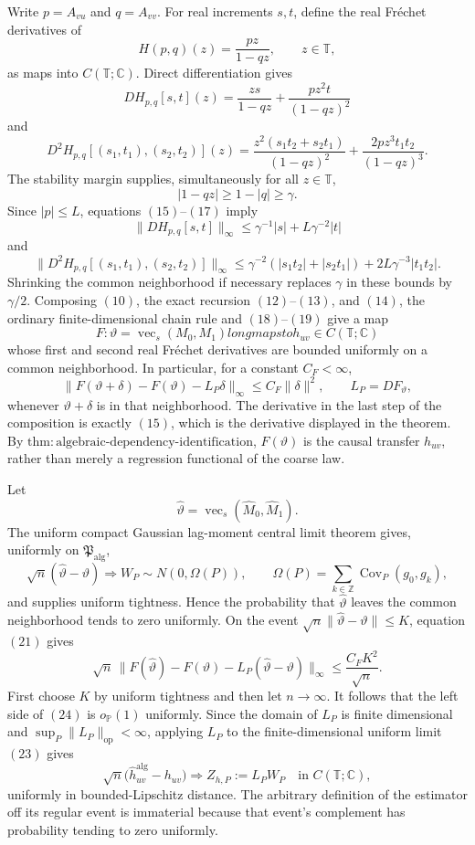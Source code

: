 Write \(p=A_{vu}\) and \(q=A_{vv}\).  For real increments \(s,t\), define the real Fr\'echet derivatives of
\[
 H(p,q)(z)=\frac{pz}{1-qz},\qquad z\in\mathbb T,
\tag{14}
\]
as maps into \(C(\mathbb T;\mathbb C)\).  Direct differentiation gives
\[
 DH_{p,q}[s,t](z)
 =\frac{zs}{1-qz}+\frac{pz^2t}{(1-qz)^2}
\tag{15}
\]
and
\[
 D^2H_{p,q}[(s_1,t_1),(s_2,t_2)](z)
 =\frac{z^2(s_1t_2+s_2t_1)}{(1-qz)^2}
  +\frac{2pz^3t_1t_2}{(1-qz)^3}.
\tag{16}
\]
The stability margin supplies, simultaneously for all \(z\in\mathbb T\),
\[
 |1-qz|\ge1-|q|\ge\gamma.
\tag{17}
\]
Since \(|p|\le L\), equations \((15)\)--\((17)\) imply
\[
 \|DH_{p,q}[s,t]\|_\infty
 \le\gamma^{-1}|s|+L\gamma^{-2}|t|
\tag{18}
\]
and
\[
 \|D^2H_{p,q}[(s_1,t_1),(s_2,t_2)]\|_\infty
 \le\gamma^{-2}(|s_1t_2|+|s_2t_1|)
   +2L\gamma^{-3}|t_1t_2|.
\tag{19}
\]
Shrinking the common neighborhood if necessary replaces \(\gamma\) in these bounds by \(\gamma/2\).  Composing \((10)\), the exact recursion \((12)\)--\((13)\), and \((14)\), the ordinary finite-dimensional chain rule and \((18)\)--\((19)\) give a map
\[
 F:\vartheta=\operatorname{vec}_{s}(M_0,M_1)longmapsto h_{uv}
 \in C(\mathbb T;\mathbb C)
\tag{20}
\]
whose first and second real Fr\'echet derivatives are bounded uniformly on a common neighborhood.  In particular, for a constant \(C_F<\infty\),
\[
 \|F(\vartheta+\delta)-F(\vartheta)-L_P\delta\|_\infty
 \le C_F\|\delta\|^2,
 \qquad L_P=DF_\vartheta,
\tag{21}
\]
whenever \(\vartheta+\delta\) is in that neighborhood.  The derivative in the last step of the composition is exactly \((15)\), which is the derivative displayed in the theorem.  By \(\mathrm{thm{:}algebraic\mbox{-}dependency\mbox{-}identification}\), \(F(\vartheta)\) is the causal transfer \(h_{uv}\), rather than merely a regression functional of the coarse law.

Let
\[
 \widehat\vartheta
 =\operatorname{vec}_{s}(\widehat M_0,\widehat M_1).
\tag{22}
\]
The uniform compact Gaussian lag-moment central limit theorem gives, uniformly on \(\mathfrak P_{\mathrm{alg}}\),
\[
 \sqrt n(\widehat\vartheta-\vartheta)
 \Longrightarrow W_P\sim N(0,\Omega(P)),
 \qquad
 \Omega(P)=\sum_{k\in\mathbb Z}\operatorname{Cov}_P(g_0,g_k),
\tag{23}
\]
and supplies uniform tightness.  Hence the probability that \(\widehat\vartheta\) leaves the common neighborhood tends to zero uniformly.  On the event \(\sqrt n\|\widehat\vartheta-\vartheta\|\le K\), equation \((21)\) gives
\[
 \sqrt n\,
 \|F(\widehat\vartheta)-F(\vartheta)-L_P(\widehat\vartheta-\vartheta)\|_\infty
 \le\frac{C_FK^2}{\sqrt n}.
\tag{24}
\]
First choose \(K\) by uniform tightness and then let \(n\to\infty\).  It follows that the left side of \((24)\) is \(o_{\mathbb P}(1)\) uniformly.  Since the domain of \(L_P\) is finite dimensional and \(\sup_P\|L_P\|_{\mathrm{op}}<\infty\), applying \(L_P\) to the finite-dimensional uniform limit \((23)\) gives
\[
 \sqrt n\bigl(\widehat h_{uv}^{\mathrm{alg}}-h_{uv}\bigr)
 \Longrightarrow Z_{h,P}:=L_PW_P
 \quad\text{in }C(\mathbb T;\mathbb C),
\tag{25}
\]
uniformly in bounded-Lipschitz distance.  The arbitrary definition of the estimator off its regular event is immaterial because that event's complement has probability tending to zero uniformly.

